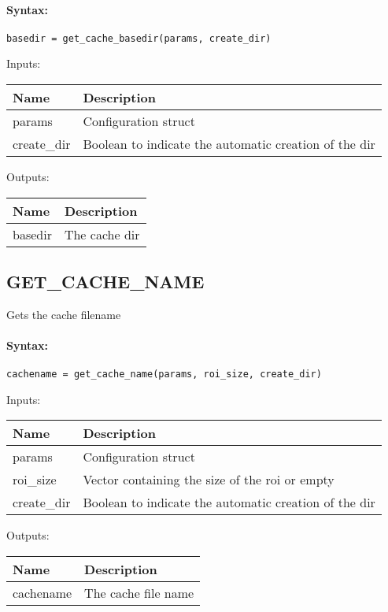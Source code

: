 \paragraph{Syntax:} \verb|basedir = get_cache_basedir(params, create_dir)|

\bigskip
Inputs:

\begin{tabular}{|p{}|p{}|}
\hline
\textbf{Name} & \textbf{Description} \\
\hline \hline
params & Configuration struct  \\ \hline
create\_dir & Boolean to indicate the automatic creation of the dir  \\ \hline
\end{tabular}

\bigskip
Outputs:

\begin{tabular}{|p{}|p{}|}
\hline
\textbf{Name} & \textbf{Description} \\
\hline \hline
basedir & The cache dir  \\ \hline
\end{tabular}

\subsection{GET\_CACHE\_NAME}

Gets the cache filename

\paragraph{Syntax:} \verb|cachename = get_cache_name(params, roi_size, create_dir)|

\bigskip
Inputs:

\begin{tabular}{|p{}|p{}|}
\hline
\textbf{Name} & \textbf{Description} \\
\hline \hline
params & Configuration struct  \\ \hline
roi\_size & Vector containing the size of the roi or empty  \\ \hline
create\_dir & Boolean to indicate the automatic creation of the dir  \\ \hline
\end{tabular}

\bigskip
Outputs:

\begin{tabular}{|p{}|p{}|}
\hline
\textbf{Name} & \textbf{Description} \\
\hline \hline
cachename & The cache file name  \\ \hline
\end{tabular}

